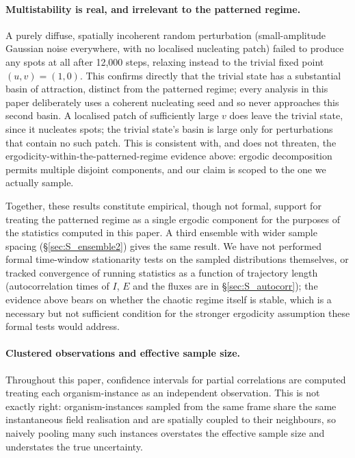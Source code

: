 \documentclass[11pt]{article}
\begin{document}
\paragraph{Multistability is real, and irrelevant to the patterned regime.} A purely diffuse, spatially incoherent random perturbation (small-amplitude Gaussian noise everywhere, with no localised nucleating patch) failed to produce any spots at all after 12{,}000 steps, relaxing instead to the trivial fixed point $(u,v)=(1,0)$. This confirms directly that the trivial state has a substantial basin of attraction, distinct from the patterned regime; every analysis in this paper deliberately uses a coherent nucleating seed and so never approaches this second basin. A localised patch of sufficiently large $v$ does leave the trivial state, since it nucleates spots; the trivial state's basin is large only for perturbations that contain no such patch. This is consistent with, and does not threaten, the ergodicity-within-the-patterned-regime evidence above: ergodic decomposition permits multiple disjoint components, and our claim is scoped to the one we actually sample.

Together, these results constitute empirical, though not formal, support for treating the patterned regime as a single ergodic component for the purposes of the statistics computed in this paper. A third ensemble with wider sample spacing (\S\ref{sec:S_ensemble2}) gives the same result. We have not performed formal time-window stationarity tests on the sampled distributions themselves, or tracked convergence of running statistics as a function of trajectory length (autocorrelation times of $I$, $E$ and the fluxes are in \S\ref{sec:S_autocorr}); the evidence above bears on whether the chaotic regime itself is stable, which is a necessary but not sufficient condition for the stronger ergodicity assumption these formal tests would address.

\paragraph{Clustered observations and effective sample size.} Throughout this paper, confidence intervals for partial correlations are computed treating each organism-instance as an independent observation. This is not exactly right: organism-instances sampled from the same frame share the same instantaneous field realisation and are spatially coupled to their neighbours, so naively pooling many such instances overstates the effective sample size and understates the true uncertainty.
\end{document}

